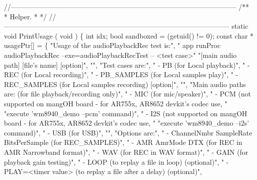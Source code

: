 \begin{DoxyCodeInclude}
{{{{{{{{{{{{{{{{{{{{{{{{{{{{{{{{{{{{{{{{{{{{{{\textcolor{comment}{//--------------------------------------------------------------------------------------------------}\textcolor{comment}{}
\textcolor{comment}{/**}
\textcolor{comment}{ * Helper.}
\textcolor{comment}{ *}
\textcolor{comment}{ */}
\textcolor{comment}{//--------------------------------------------------------------------------------------------------}
\textcolor{keyword}{static} \textcolor{keywordtype}{void} PrintUsage
(
    \textcolor{keywordtype}{void}
)
\{
    \textcolor{keywordtype}{int} idx;
    \textcolor{keywordtype}{bool} sandboxed = (getuid() != 0);
    \textcolor{keyword}{const} \textcolor{keywordtype}{char} * usagePtr[] = \{
            \textcolor{stringliteral}{"Usage of the audioPlaybackRec test is:"},
            \textcolor{stringliteral}{"   app runProc audioPlaybackRec --exe=audioPlaybackRecTest -- <test case>"}
              \textcolor{stringliteral}{"[main audio path] [file's name] [option]"},
            \textcolor{stringliteral}{""},
            \textcolor{stringliteral}{"Test cases are:"},
            \textcolor{stringliteral}{" - PB (for Local playback)"},
            \textcolor{stringliteral}{" - REC (for Local recording)"},
            \textcolor{stringliteral}{" - PB\_SAMPLES (for Local samples play)"},
            \textcolor{stringliteral}{" - REC\_SAMPLES (for Local samples recording) [option]"},
            \textcolor{stringliteral}{""},
            \textcolor{stringliteral}{"Main audio paths are: (for file playback/recording only)"},
            \textcolor{stringliteral}{" - MIC (for mic/speaker)"},
            \textcolor{stringliteral}{" - PCM (not supported on mangOH board - for AR755x, AR8652 devkit's codec use, "}
                \textcolor{stringliteral}{"execute 'wm8940\_demo --pcm' command)"},
            \textcolor{stringliteral}{" - I2S (not supported on mangOH board - for AR755x, AR8652 devkit's codec use, "}
                \textcolor{stringliteral}{"execute 'wm8940\_demo --i2s' command)"},
            \textcolor{stringliteral}{" - USB (for USB)"},
            \textcolor{stringliteral}{""},
            \textcolor{stringliteral}{"Options are:"},
            \textcolor{stringliteral}{" - ChannelNmbr SampleRate BitsPerSample (for REC\_SAMPLES)"},
            \textcolor{stringliteral}{" - AMR AmrMode DTX (for REC in AMR Narrowband format)"},
            \textcolor{stringliteral}{" - WAV (for REC in WAV format)"},
            \textcolor{stringliteral}{" - GAIN (for playback gain testing)"},
            \textcolor{stringliteral}{" - LOOP (to replay a file in loop) (optional)"},
            \textcolor{stringliteral}{" - PLAY=<timer value> (to replay a file after a delay) (optional)"},
}}}}}}}}}}}}}}}}}}}}}}}}}}}}}}}}}}}}}}}}}}}}}}
\end{DoxyCodeInclude}
